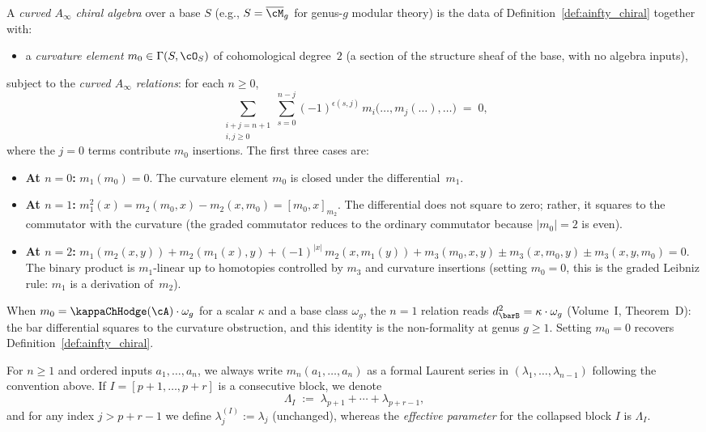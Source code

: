 \begin{definition}
\label{def:curved-ainfty-chiral}
A \emph{curved $A_\infty$ chiral algebra} over a base $S$ (e.g., $S = \overline{\cM}_g$ for genus-$g$ modular theory) is the data of Definition~\ref{def:ainfty_chiral} together with:
\begin{itemize}
\item a \emph{curvature element} $m_0 \in \Gamma(S, \cO_S)$ of cohomological degree~$2$ (a section of the structure sheaf of the base, with no algebra inputs),
\end{itemize}
subject to the \emph{curved $A_\infty$ relations}: for each $n \geq 0$,
\[
\sum_{\substack{i+j = n+1 \\ i,j \geq 0}} \sum_{s=0}^{n-j} (-1)^{\epsilon(s,j)}\, m_i\bigl(\ldots, m_j(\ldots), \ldots\bigr) \;=\; 0,
\]
where the $j=0$ terms contribute $m_0$ insertions. The first three cases are:
\begin{itemize}
\item \textbf{At $n=0$:}\; $m_1(m_0) = 0$. The curvature element $m_0$ is closed under the differential~$m_1$.
\item \textbf{At $n=1$:}\; $m_1^2(x) = m_2(m_0, x) - m_2(x, m_0) = [m_0, x]_{m_2}$. The differential does not square to zero; rather, it squares to the commutator with the curvature (the graded commutator reduces to the ordinary commutator because $|m_0| = 2$ is even).
\item \textbf{At $n=2$:}\; $m_1(m_2(x,y)) + m_2(m_1(x),y) + (-1)^{|x|}\,m_2(x,m_1(y)) + m_3(m_0,x,y) \pm m_3(x,m_0,y) \pm m_3(x,y,m_0) = 0$. The binary product is $m_1$-linear up to homotopies controlled by $m_3$ and curvature insertions (setting $m_0=0$, this is the graded Leibniz rule: $m_1$ is a derivation of~$m_2$).
\end{itemize}
When $m_0 = \kappaChHodge(\cA) \cdot \omega_g$ for a scalar $\kappa$ and a base class $\omega_g$, the $n=1$ relation reads $d_{\barB}^2 = \kappa \cdot \omega_g$ (Volume~I, Theorem~D): the bar differential squares to the curvature obstruction, and this identity is the non-formality at genus $g \geq 1$. Setting $m_0 = 0$ recovers Definition~\ref{def:ainfty_chiral}.
\end{definition}

\begin{notation}
\label{not:spectral}
For $n\ge1$ and ordered inputs $a_1,\dots,a_n$, we always write $m_n(a_1,\dots,a_n)$ as a formal Laurent series in $(\lambda_1,\dots,\lambda_{n-1})$ following the convention above. If $I=[p+1,\dots,p+r]$ is a consecutive block, we denote
\[
\Lambda_I\;:=\;\lambda_{p+1}+\cdots+\lambda_{p+r-1},
\]
and for any index $j>p+r-1$ we define $\lambda^{(I)}_j:=\lambda_j$ (unchanged), whereas the \emph{effective parameter} for the collapsed block $I$ is $\Lambda_I$.
\end{notation}


